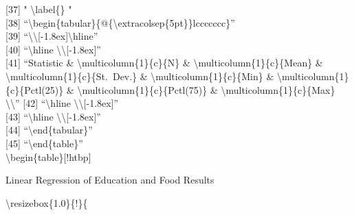 \documentclass[]{article}
\begin{document}
{[}37{]} " \textbackslash{}label\{\} "\\
{[}38{]}
``\textbackslash{}begin\{tabular\}\{@\{\textbackslash{}extracolsep\{5pt\}\}lccccccc\}''\\
{[}39{]}
``\textbackslash{}\textbackslash{}{[}-1.8ex{]}\textbackslash{}hline''\\
{[}40{]} ``\textbackslash{}hline
\textbackslash{}\textbackslash{}{[}-1.8ex{]}''\\
{[}41{]} ``Statistic \& \textbackslash{}multicolumn\{1\}\{c\}\{N\} \&
\textbackslash{}multicolumn\{1\}\{c\}\{Mean\} \&
\textbackslash{}multicolumn\{1\}\{c\}\{St.~Dev.\} \&
\textbackslash{}multicolumn\{1\}\{c\}\{Min\} \&
\textbackslash{}multicolumn\{1\}\{c\}\{Pctl(25)\} \&
\textbackslash{}multicolumn\{1\}\{c\}\{Pctl(75)\} \&
\textbackslash{}multicolumn\{1\}\{c\}\{Max\}
\textbackslash{}\textbackslash{}'' {[}42{]} ``\textbackslash{}hline
\textbackslash{}\textbackslash{}{[}-1.8ex{]}''\\
{[}43{]} ``\textbackslash{}hline
\textbackslash{}\textbackslash{}{[}-1.8ex{]}''\\
{[}44{]} ``\textbackslash{}end\{tabular\}''\\
{[}45{]} ``\textbackslash{}end\{table\}''\\
\textbackslash{}begin\{table\}{[}!htbp{]}
\centering    \caption{Linear Regression of Education and Food Results}    \label{}
\textbackslash{}resizebox\{1.0\textwidth\}\{!\}\{
\end{document}
